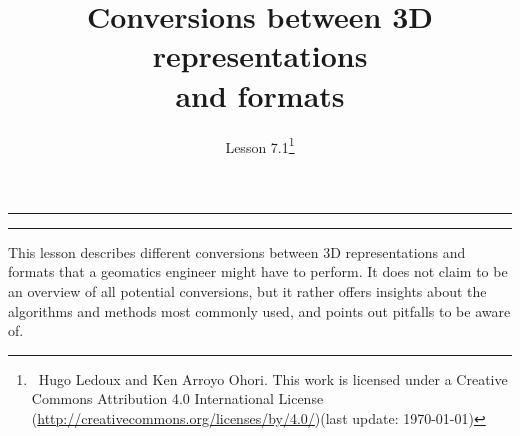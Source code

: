 

\newcommand{\lessonNumber}{Lesson 7.1}

\usepackage{listings}
\usepackage{color}
\lstset{style=mystyle,basicstyle=\ttfamily\footnotesize,breaklines=true}


\title{Conversions between 3D representations\\ and formats}

\ohead*{\lessonNumber}
\titlehead{\thispagestyle{headings}}
\author{\lessonNumber\footnote{\ccbysa\ Hugo Ledoux and Ken Arroyo Ohori. This work is licensed under a Creative Commons Attribution 4.0 International License (\url{http://creativecommons.org/licenses/by/4.0/})\newline(last update: \today)}}
\date{}

\pagestyle{scrheadings}

\maketitle

\noindent\rule{5cm}{0.4pt}
\tableofcontents
\noindent\rule{5cm}{0.4pt}
\vspace{5mm}

This lesson describes different conversions between 3D representations and formats that a geomatics engineer might have to perform.
It does not claim to be an overview of all potential conversions, but it rather offers insights about the algorithms and methods most commonly used, and points out pitfalls to be aware of.

%

